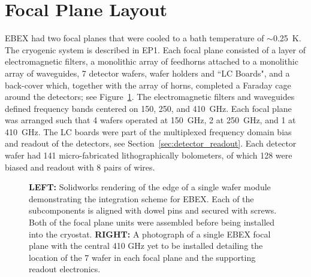 \documentclass[../EBEXPaper2.tex]{subfiles}
\begin{document}
\section{Focal Plane Layout}
\label{sec:focal_plane_layout}

\ac{EBEX} had two focal planes that were cooled to a bath temperature of $\sim$0.25~K. The cryogenic system is described in \ac{EP1}.
Each focal plane consisted of a layer of electromagnetic filters, a monolithic
array of feedhorns attached to a monolithic array of waveguides, 7 detector wafers, wafer holders 
and ``\ac{LC} Boards", 
and a back-cover which, together with the array of horns, completed a Faraday cage around 
the detectors; see Figure~\ref{fig:EBEX_Focal_Plane}. The electromagnetic filters and waveguides 
defined frequency bands centered on 150, 250, and 410~GHz. Each focal plane was arranged such that 
4 wafers operated at 150~GHz, 2 at 250~GHz, and 1 at 410~GHz. The \ac{LC} boards were part of the 
multiplexed frequency domain bias and readout of the detectors, see Section~\ref{sec:detector_readout}. 
Each detector wafer had 141 micro-fabricated lithographically bolometers, of which 128 
were biased and readout with 8 pairs of wires.  

\begin{figure}[ht]
\centering
{}
\caption{\textbf{LEFT:} Solidworks rendering of the edge of a single wafer module demonstrating the integration scheme for \ac{EBEX}.  Each of the subcomponents is aligned with dowel pins and secured with screws.  Both of the focal plane units were assembled before being installed into the cryostat. \textbf{RIGHT:} A photograph of a single \ac{EBEX} focal plane with the central 410 GHz yet to be installed detailing the location of the 7 wafer in each focal plane and the supporting readout electronics. \label{fig:EBEX_Focal_Plane}}
\end{figure}
\end{document}
